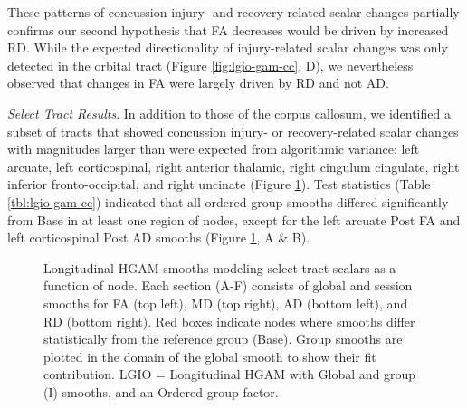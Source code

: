 \documentclass[12pt]{article}
\begin{document}
These patterns of concussion injury- and recovery-related scalar changes partially confirms our second hypothesis that FA decreases would be driven by increased RD. While the expected directionality of injury-related scalar changes was only detected in the orbital tract (Figure \ref{fig:lgio-gam-cc}, D), we nevertheless observed that changes in FA were largely driven by RD and not AD.


\textit{Select Tract Results}. In addition to those of the corpus callosum, we identified a subset of tracts that showed concussion injury- or recovery-related scalar changes with magnitudes larger than were expected from algorithmic variance: left arcuate, left corticospinal, right anterior thalamic, right cingulum cingulate, right inferior fronto-occipital, and right uncinate (Figure \ref{fig:lgio-gam-sel}). Test statistics (Table \ref{tbl:lgio-gam-cc}) indicated that all ordered group smooths differed significantly from Base in at least one region of nodes, except for the left arcuate Post FA and left corticospinal Post AD smooths (Figure \ref{fig:lgio-gam-sel}, A \& B).

\begin{figure}[H]
	\centering
	\caption{Longitudinal HGAM smooths modeling select tract scalars as a function of node. Each section (A-F) consists of global and session smooths for FA (top left), MD (top right), AD (bottom left), and RD (bottom right). Red boxes indicate nodes where smooths differ statistically from the reference group (Base). Group smooths are plotted in the domain of the global smooth to show their fit contribution. LGIO = Longitudinal HGAM with Global and group (I) smooths, and an Ordered group factor.}
	\label{fig:lgio-gam-sel}
\end{figure}
\end{document}
